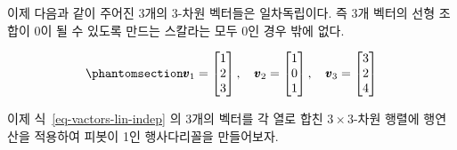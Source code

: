 \documentclass[
  11pt,
  a4paper,
  oneside]{scrbook}
\theoremstyle{definition}
\theoremstyle{definition}
\theoremstyle{plain}
\theoremstyle{remark}
\begin{document}
이제 다음과 같이 주어진 3개의 3-차원 벡터들은 일차독립이다. 즉 3개
벡터의 선형 조합이 0이 될 수 있도록 만드는 스칼라는 모두 0인 경우 밖에
없다.

\begin{equation}\phantomsection\label{eq-vactors-lin-indep}{
\pmb v_1 =
\begin{bmatrix}
1\\
2\\
3
\end{bmatrix},
\quad
\pmb v_2 =
\begin{bmatrix}
1\\
0\\
1
\end{bmatrix},
\quad
\pmb v_3 =
\begin{bmatrix}
3\\
2\\
4
\end{bmatrix}
}\end{equation}

이제 식~\ref{eq-vactors-lin-indep} 의 3개의 벡터를 각 열로 합친
\(3 \times 3\)-차원 행렬에 행연산을 적용하여 피봇이 1인 행사다리꼴을
만들어보자.
\end{document}

